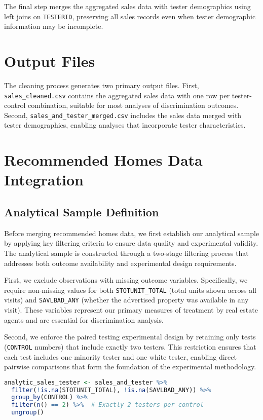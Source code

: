 \documentclass{article}
\begin{document}
The final step merges the aggregated sales data with tester demographics using left joins on \texttt{TESTERID}, preserving all sales records even when tester demographic information may be incomplete.

\section{Output Files}

The cleaning process generates two primary output files. First, \texttt{sales\_cleaned.csv} contains the aggregated sales data with one row per tester-control combination, suitable for most analyses of discrimination outcomes. Second, \texttt{sales\_and\_tester\_merged.csv} includes the sales data merged with tester demographics, enabling analyses that incorporate tester characteristics.

\section{Recommended Homes Data Integration}

\subsection{Analytical Sample Definition}

Before merging recommended homes data, we first establish our analytical sample by applying key filtering criteria to ensure data quality and experimental validity. The analytical sample is constructed through a two-stage filtering process that addresses both outcome availability and experimental design requirements.

First, we exclude observations with missing outcome variables. Specifically, we require non-missing values for both \texttt{STOTUNIT\_TOTAL} (total units shown across all visits) and \texttt{SAVLBAD\_ANY} (whether the advertised property was available in any visit). These variables represent our primary measures of treatment by real estate agents and are essential for discrimination analysis.

Second, we enforce the paired testing experimental design by retaining only tests (\texttt{CONTROL} numbers) that include exactly two testers. This restriction ensures that each test includes one minority tester and one white tester, enabling direct pairwise comparisons that form the foundation of the experimental methodology.

\begin{lstlisting}[language=R]
analytic_sales_tester <- sales_and_tester %>%
  filter(!is.na(STOTUNIT_TOTAL), !is.na(SAVLBAD_ANY)) %>%
  group_by(CONTROL) %>%
  filter(n() == 2) %>%  # Exactly 2 testers per control
  ungroup()
\end{lstlisting}
\end{document}
